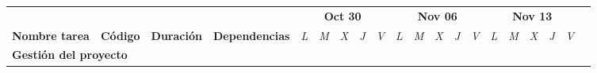 \begin{longtable}[c]{llclllllllllllllllll}
        \multicolumn{1}{|c|}{}                                                                                                  & \multicolumn{1}{c|}{}                                                          & \multicolumn{1}{c|}{}                                                            & \multicolumn{1}{c|}{}                                                                & \multicolumn{5}{c|}{\textbf{Oct 30}}                                                                                                                                    & \multicolumn{5}{c|}{\textbf{Nov 06}}                                                                                                                                    & \multicolumn{5}{c|}{\textbf{Nov 13}}                                                                                                                                                  &  \\ \cline{5-19}
        \multicolumn{1}{|c|}{\multirow{-2}{*}{\textbf{Nombre tarea}}}                                                           & \multicolumn{1}{c|}{\multirow{-2}{*}{\textbf{Código}}}                         & \multicolumn{1}{c|}{\multirow{-2}{*}{\textbf{Duración}}}                         & \multicolumn{1}{c|}{\multirow{-2}{*}{\textbf{Dependencias}}}                         & \multicolumn{1}{l|}{\textit{L}} & \multicolumn{1}{l|}{\textit{M}} & \multicolumn{1}{l|}{\textit{X}} & \multicolumn{1}{l|}{\textit{J}} & \multicolumn{1}{l|}{\textit{V}} & \multicolumn{1}{l|}{\textit{L}} & \multicolumn{1}{l|}{\textit{M}} & \multicolumn{1}{l|}{\textit{X}} & \multicolumn{1}{l|}{\textit{J}} & \multicolumn{1}{l|}{\textit{V}} & \multicolumn{1}{l|}{\textit{L}} & \multicolumn{1}{l|}{\textit{M}} & \multicolumn{1}{l|}{\textit{X}} & \multicolumn{1}{l|}{\textit{J}} & \multicolumn{1}{l|}{\textit{V}}               &  \\ \cline{1-19}
        \multicolumn{4}{|l|}{\textbf{Gestión del proyecto}}                                                                                                                                                                                                                                                                                                                                & \multicolumn{15}{l|}{}                                                                                                                                                                                                                                                                                                                                                                                                                                                                                                                    &  \\ \cline{1-19}

\end{longtable}
